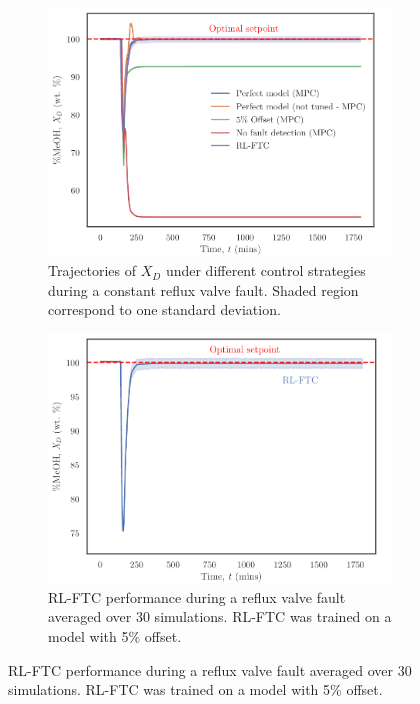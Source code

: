 \begin{figure}[h]
    \begin{center}
    \begin{subfigure}[b]{0.49\textwidth}
        \includegraphics[width=\textwidth]{images/ftc/FTC_Comparison.pdf}
        \caption{{\scriptsize Trajectories of $X_D$ under different control strategies during a constant reflux valve fault. Shaded region correspond to one standard deviation.}}
        \label{fig:ftcComparison}
    \end{subfigure}
    \hfill
    \begin{subfigure}[b]{0.49\textwidth}
        \includegraphics[width=\textwidth]{images/ftc/RL_FTC.pdf}
        \caption{{\scriptsize RL-FTC performance during a reflux valve fault averaged over 30 simulations.  RL-FTC was trained on a model with 5\% offset.}}
        \label{fig:ftcRL_FTCS}
    \end{subfigure}
    \end{center}
\end{figure}

